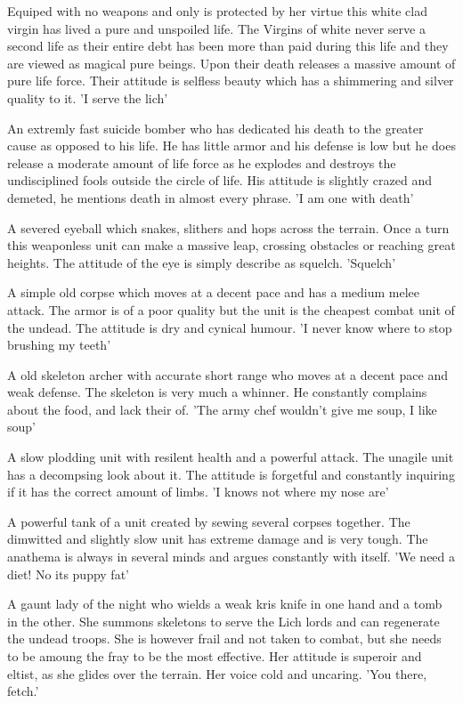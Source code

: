 \documentclass[a4paper,twocolumn]{article}
\begin{document}
Equiped with no weapons and only is protected by her virtue this white clad virgin has lived a pure and unspoiled life. The Virgins of white never serve a second life as their entire debt has been more than paid during this life and they are viewed as magical pure beings. Upon their death releases a massive amount of pure life force. Their attitude is selfless beauty which has a shimmering and silver quality to it. 'I serve the lich'

An extremly fast suicide bomber who has dedicated his death to the greater cause as opposed to his life. He has little armor and his defense is low but he does release a moderate amount of life force as he explodes and destroys the undisciplined fools outside the circle of life. His attitude is slightly crazed and demeted, he mentions death in almost every phrase. 'I am one with death'

A severed eyeball which snakes, slithers and hops across the terrain. Once a turn this weaponless unit can make a massive leap, crossing obstacles or reaching great heights. The attitude of the eye is simply describe as squelch. 'Squelch'

A simple old corpse which moves at a decent pace and has a medium melee attack. The armor is of a poor quality but the unit is the cheapest combat unit of the undead. The attitude is dry and cynical humour. 'I never know where to stop brushing my teeth'

A old skeleton archer with accurate short range who moves at a decent pace and weak defense. The skeleton is very much a whinner. He constantly complains about the food, and lack their of. 'The army chef wouldn't give me soup, I like soup'

A slow plodding unit with resilent health and a powerful attack. The unagile unit has a decompsing look about it. The attitude is forgetful and constantly inquiring if it has the correct amount of limbs. 'I knows not where my nose are'

A powerful tank of a unit created by sewing several corpses together. The dimwitted and slightly slow unit has extreme damage and is very tough. The anathema is always in several minds and argues constantly with itself. 'We need a diet! No its puppy fat'

A gaunt lady of the night who wields a weak kris knife in one hand and a tomb in the other. She summons skeletons to serve the Lich lords and can regenerate the undead troops. She is however frail and not taken to combat, but she needs to be amoung the fray to be the most effective. Her attitude is superoir and eltist, as she glides over the terrain. Her voice cold and uncaring. 'You there, fetch.'
\end{document}
